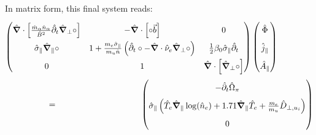 In matrix form, this final system reads:
\begin{align}
	\renewcommand\arraystretch{1.8}
	\begin{pmatrix}
		\hat{\grad}\cdot\left[\frac{\hat{m}_\alpha \hat{n}_\alpha}{ \hat{B}^2}\hat{\partial}_t\hat{\grad}_\perp\circ\right]  & 
		-\hat{\grad}\cdot\left[\circ\vec{b}\right] & 
		0 \\
		\hat{\sigma}_\parallel\hat{\grad}_\parallel\circ &
		1 + \frac{m_e\hat{\sigma}_\parallel}{m_u\hat{n}}\left(\hat{\partial}_t\circ - \hat{\grad}\cdot\hat{\nu}_e\hat{\grad}_\perp\circ\right) &
		\frac{1}{2}\beta_0\hat{\sigma}_\parallel\hat{\partial}_t \\
		0 & 1 & \hat{\grad}\cdot\left[\hat{\grad}_\perp\circ\right]
	\end{pmatrix}
	\begin{pmatrix}
		\hat{\Phi} \\ \hat{j}_\parallel \\ \hat{A}_\parallel
	\end{pmatrix}  \hspace{1.5cm}\nonumber\\ = \hspace{3.5cm}
	\begin{pmatrix}
		-\hat{\partial}_t \hat{\Omega}_\pi \\
		\hat{\sigma}_\parallel\left(\hat{T}_e\hat{\grad}_\parallel\log(\hat{n}_e) + 1.71\hat{\grad}_\parallel \hat{T}_e + \frac{m_e}{m_u}\hat{D}_{\perp,u_i}\right) \\
		0
	\end{pmatrix} \label{eq:vorticityEquation_ElectronInertiaElectromagnetism_dedimensionalized}
\end{align} 





